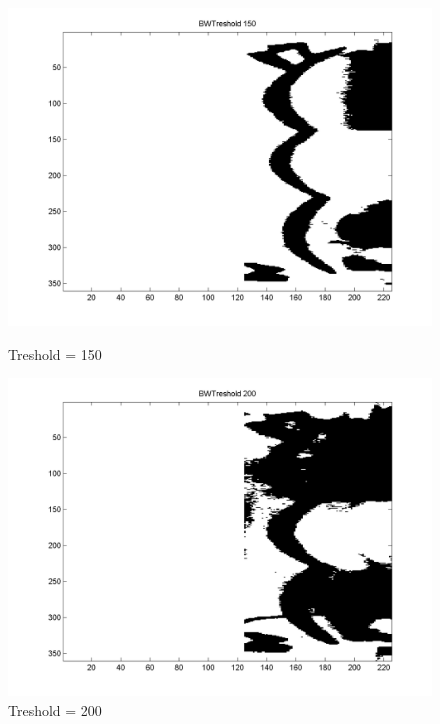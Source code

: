 \documentclass[a4paper]{article}
\begin{document}
\begin{figure}[h!]
  \begin{minipage}[b]{0.5\linewidth}
    \centering
    \includegraphics[width=\linewidth]{img/BWTreshold_150.png}
    \caption{Treshold = 150}
    \label{fig:bw150}
  \end{minipage}
  \hspace{0.5cm}
  \begin{minipage}[b]{0.5\linewidth}
    \centering
    \includegraphics[width=\linewidth]{img/BWTreshold_200.png}
    \caption{Treshold = 200}
    \label{fig:bw200}
  \end{minipage}
\end{figure}
\end{document}
